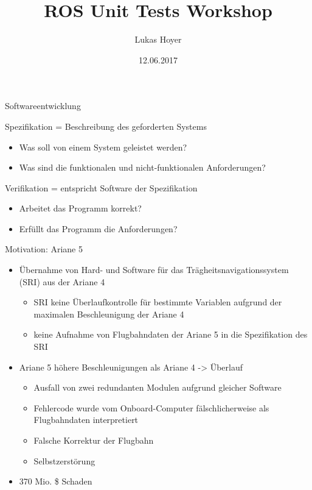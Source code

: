 \documentclass{beamer}
\title{ROS Unit Tests Workshop}
\author{Lukas Hoyer}
\institute[]{Otto-von-Guericke-Universität Magdeburg}
\date{12.06.2017}
\begin{document}
\maketitle

\begin{frame}{Softwareentwicklung}
	\begin{block}{Spezifikation}
		= Beschreibung des geforderten Systems
		\begin{itemize}
			\item Was soll von einem System geleistet werden?
			\item Was sind die funktionalen und nicht-funktionalen Anforderungen?
		\end{itemize}
	\end{block}
	\begin{block}{Verifikation}
		= entspricht Software der Spezifikation	
		\begin{itemize}
			\item Arbeitet das Programm korrekt?
			\item Erfüllt das Programm die Anforderungen?
		\end{itemize}
	\end{block}
\end{frame}

\begin{frame}{Motivation: Ariane 5}
\begin{itemize}
	\item Übernahme von Hard- und Software für das
Trägheitsnavigationssystem (SRI) aus der Ariane 4
	\begin{itemize}
		\item SRI keine Überlaufkontrolle für bestimmte Variablen aufgrund der maximalen Beschleunigung der Ariane 4
		\item keine Aufnahme von Flugbahndaten der Ariane 5 in die Spezifikation des SRI	
	\end{itemize}
	\pause
	\item Ariane 5 höhere Beschleunigungen als Ariane 4 -> Überlauf
	\begin{itemize}
		\item Ausfall von zwei redundanten Modulen aufgrund gleicher Software
		\item Fehlercode wurde vom Onboard-Computer fälschlicherweise als Flugbahndaten interpretiert
		\item Falsche Korrektur der Flugbahn
		\item Selbstzerstörung
	\end{itemize}
	\pause
	\item 370 Mio. \$ Schaden
\end{itemize}
\end{frame}
\end{document}
